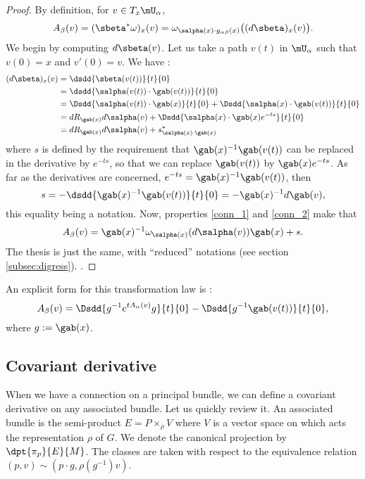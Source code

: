 \begin{proof}
By definition, for $v\in T_x\mU_{\alpha}$,
\[
   A_{\beta}(v)=(\sbeta^*\omega)_x(v)=
         \omega_{\salpha(x)\cdot g_{\alpha\beta}(x)}\big((d\sbeta)_x(v)\big).
\]
We begin by computing $d\sbeta(v)$. Let us take a path $v(t)$ in $\mU_{\alpha}$ such that $v(0)=x$ and $v'(0)=v$. We have :
\begin{equation}\label{eq:1407r1}
\begin{split}
   (d\sbeta)_x(v)&=\dsdd{\sbeta(v(t))}{t}{0}\\
                 &=\dsdd{\salpha(v(t))\cdot\gab(v(t))}{t}{0}\\
		 &=\Dsdd{\salpha(v(t))\cdot\gab(x)}{t}{0}
		    +\Dsdd{\salpha(x)\cdot\gab(v(t))}{t}{0}\\
		 &=dR_{\gab(x)}d\salpha(v)+\Dsdd{\salpha(x)\cdot\gab(x)e^{-ts}}{t}{0}\\
		 &=dR_{\gab(x)}d\salpha(v)+s^*_{\salpha(x)\cdot\gab(x)}
\end{split}
\end{equation}
where $s$ is defined by the requirement\label{pg:justif_s} that $\gab(x)^{-1}\gab(v(t))$ can be replaced in the derivative by $e^{-ts}$, so that we can replace $\gab(v(t))$ by $\gab(x)e^{-ts}$. As far as the derivatives are concerned, $e^{-ts}=\gab(x)^{-1}\gab(v(t))$, then
\[
     s=-\dsdd{\gab(x)^{-1}\gab(v(t))}{t}{0}=-\gab(x)^{-1} d\gab(v),
\]
this equality being a notation. Now, properties \eqref{conn_1} and \eqref{conn_2} make that
\[
   A_{\beta}(v)=\gab(x)^{-1}\omega_{\salpha(x)}(d\salpha(v))\gab(x)+s.
\]
The thesis is just the same, with ``reduced'' notations (see section \ref{subsec:digress}).
.
\end{proof}
An explicit form for this transformation law is :
\begin{equation}
    A_{\beta}(v)=\Dsdd{g^{-1} e^{tA_{\alpha}(v)}g}{t}{0}-\Dsdd{g^{-1}\gab(v(t))}{t}{0},
\end{equation}
where $g:=\gab(x)$.

\subsection{Covariant derivative}

When we have a connection on a principal bundle, we can define a covariant derivative on any associated bundle. Let us quickly review it. An associated bundle is the semi-product $E=P\times_{\rho} V$ where $V$ is a vector space on which acts the representation $\rho$ of $G$. We denote the canonical projection by $\dpt{\pi_p}{E}{M}$. The classes are taken with respect to the equivalence relation $(p,v)\sim(p\cdot g,\rho(g^{-1})v)$.


